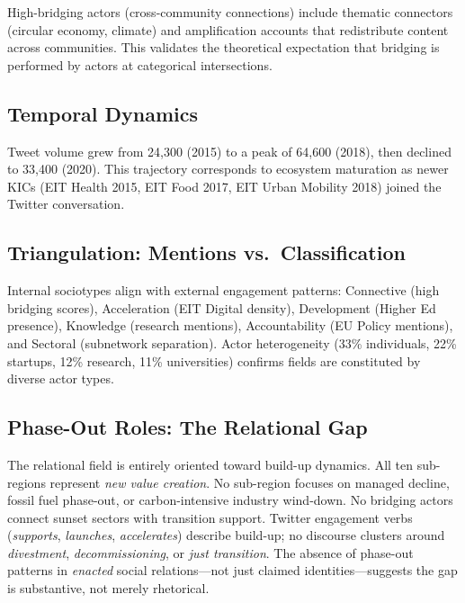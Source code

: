 \documentclass[../main.tex]{subfiles}
\begin{document}
High-bridging actors (cross-community connections) include thematic connectors (circular economy, climate) and amplification accounts that redistribute content across communities. This validates the theoretical expectation that bridging is performed by actors at categorical intersections.

\subsection{Temporal Dynamics}

Tweet volume grew from 24,300 (2015) to a peak of 64,600 (2018), then declined to 33,400 (2020). This trajectory corresponds to ecosystem maturation as newer KICs (EIT Health 2015, EIT Food 2017, EIT Urban Mobility 2018) joined the Twitter conversation.

\subsection{Triangulation: Mentions vs.\ Classification}

Internal sociotypes align with external engagement patterns: Connective (high bridging scores), Acceleration (EIT Digital density), Development (Higher Ed presence), Knowledge (research mentions), Accountability (EU Policy mentions), and Sectoral (subnetwork separation). Actor heterogeneity (33\% individuals, 22\% startups, 12\% research, 11\% universities) confirms fields are constituted by diverse actor types.


\subsection{Phase-Out Roles: The Relational Gap}

The relational field is entirely oriented toward build-up dynamics. All ten sub-regions represent \emph{new value creation}. No sub-region focuses on managed decline, fossil fuel phase-out, or carbon-intensive industry wind-down. No bridging actors connect sunset sectors with transition support. Twitter engagement verbs (\emph{supports}, \emph{launches}, \emph{accelerates}) describe build-up; no discourse clusters around \emph{divestment}, \emph{decommissioning}, or \emph{just transition}. The absence of phase-out patterns in \emph{enacted} social relations---not just claimed identities---suggests the gap is substantive, not merely rhetorical.
\end{document}
